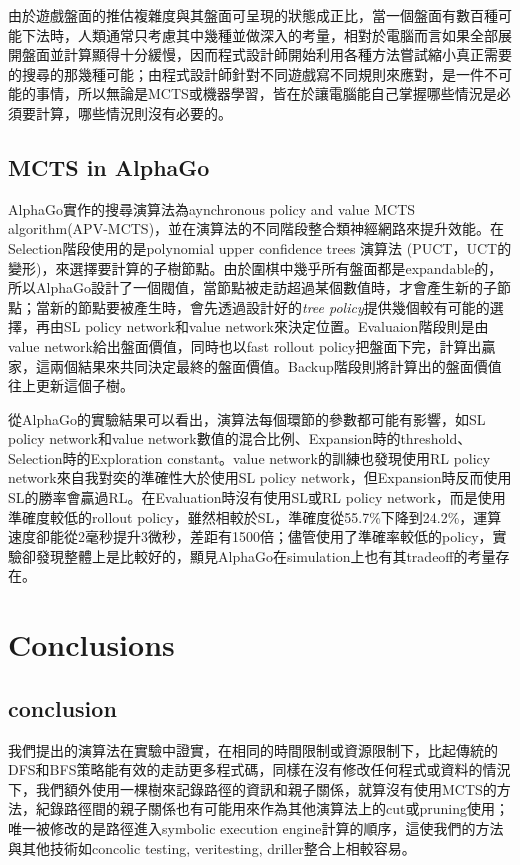 \documentclass[12pt,a4paper,oneside]{book}
\begin{document}
由於遊戲盤面的推估複雜度與其盤面可呈現的狀態成正比，當一個盤面有數百種可能下法時，人類通常只考慮其中幾種並做深入的考量，相對於電腦而言如果全部展開盤面並計算顯得十分緩慢，因而程式設計師開始利用各種方法嘗試縮小真正需要的搜尋的那幾種可能；由程式設計師針對不同遊戲寫不同規則來應對，是一件不可能的事情，所以無論是MCTS或機器學習，皆在於讓電腦能自己掌握哪些情況是必須要計算，哪些情況則沒有必要的。

\section{MCTS in AlphaGo}

AlphaGo實作的搜尋演算法為aynchronous policy and value MCTS algorithm(APV-MCTS)，並在演算法的不同階段整合類神經網路來提升效能。在Selection階段使用的是polynomial upper confidence trees 演算法 (PUCT，UCT的變形)，來選擇要計算的子樹節點。由於圍棋中幾乎所有盤面都是expandable的，所以AlphaGo設計了一個閥值，當節點被走訪超過某個數值時，才會產生新的子節點；當新的節點要被產生時，會先透過設計好的\textit{tree policy}提供幾個較有可能的選擇，再由SL policy network和value network來決定位置。Evaluaion階段則是由value network給出盤面價值，同時也以fast rollout policy把盤面下完，計算出贏家，這兩個結果來共同決定最終的盤面價值。Backup階段則將計算出的盤面價值往上更新這個子樹。

從AlphaGo的實驗結果可以看出，演算法每個環節的參數都可能有影響，如SL policy network和value network數值的混合比例、Expansion時的threshold、Selection時的Exploration constant。value network的訓練也發現使用RL policy network來自我對奕的準確性大於使用SL policy network，但Expansion時反而使用SL的勝率會贏過RL。在Evaluation時沒有使用SL或RL policy network，而是使用準確度較低的rollout policy，雖然相較於SL，準確度從55.7\%下降到24.2\%，運算速度卻能從2毫秒提升3微秒，差距有1500倍；儘管使用了準確率較低的policy，實驗卻發現整體上是比較好的，顯見AlphaGo在simulation上也有其tradeoff的考量存在。

\chapter{Conclusions}

\section{conclusion}

我們提出的演算法在實驗中證實，在相同的時間限制或資源限制下，比起傳統的DFS和BFS策略能有效的走訪更多程式碼，同樣在沒有修改任何程式或資料的情況下，我們額外使用一棵樹來記錄路徑的資訊和親子關係，就算沒有使用MCTS的方法，紀錄路徑間的親子關係也有可能用來作為其他演算法上的cut或pruning使用；唯一被修改的是路徑進入symbolic execution engine計算的順序，這使我們的方法與其他技術如concolic testing\cite{sen2007concolic}, veritesting\cite{Veritesting}, driller\cite{stephens2016driller}整合上相較容易。
\end{document}
